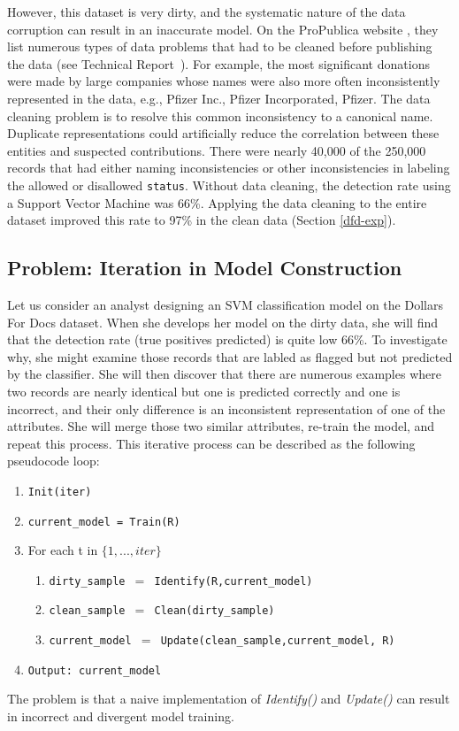 However, this dataset is very dirty, and the systematic nature of the data corruption can result in an inaccurate model.
On the ProPublica website \cite{dollarsfordocs}, they list numerous types of data problems that had to be cleaned before publishing the data (see Technical Report~\cite{activecleanarxiv}).
For example, the most significant donations were made by large companies whose names were also more often inconsistently represented in the data, e.g., Pfizer Inc., Pfizer Incorporated, Pfizer.
The data cleaning problem is to resolve this common inconsistency to a canonical name.
Duplicate representations could artificially reduce the correlation between these entities and suspected contributions.
There were nearly 40,000 of the 250,000 records that had either naming inconsistencies or other inconsistencies in labeling the allowed or disallowed \texttt{status}.
Without data cleaning, the detection rate using a Support Vector Machine was 66\%.
Applying the data cleaning to the entire dataset improved this rate to 97\% in the clean data (Section \ref{dfd-exp}).

\subsection{Problem: Iteration in Model Construction}
Let us consider an analyst designing an SVM classification model on the Dollars For Docs dataset.
When she develops her model on the dirty data, she will find that the detection rate (true positives predicted) is quite low 66\%.
To investigate why, she might examine those records that are labled as flagged but not predicted by the classifier.
She will then discover that there are numerous examples where two records are nearly identical but one is predicted correctly and one is incorrect, and their only difference is an inconsistent representation of one of the attributes.
She will merge those two similar attributes, re-train the model, and repeat this process.
This iterative process can be described as the following pseudocode loop:
\begin{enumerate}[leftmargin=1em]\scriptsize\sloppy
  \item \texttt{Init(iter)}
  \item \texttt{current\_model = Train(R)}
  \item For each t in $\{1,...,iter\}$
  \begin{enumerate}
    \item \texttt{dirty\_sample $=$ Identify(R,current\_model)}
    \item \texttt{clean\_sample $=$ Clean(dirty\_sample)}
    \item \texttt{current\_model $=$ Update(clean\_sample,current\_model, R)}
  \end{enumerate}
  \item \texttt{Output: current\_model}
  \end{enumerate}
The problem is that a naive implementation of \emph{Identify()} and \emph{Update()} can result in incorrect and divergent model training.


